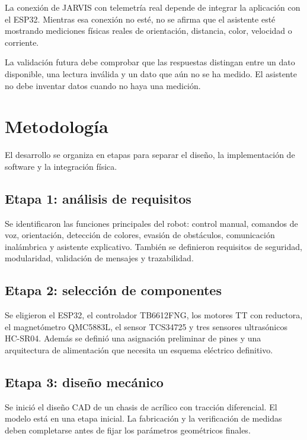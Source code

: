 \documentclass[journal]{IEEEtran}
\begin{document}
La conexión de JARVIS con telemetría real depende de integrar la aplicación con el ESP32. Mientras esa conexión no esté, no se afirma que el asistente esté mostrando mediciones físicas reales de orientación, distancia, color, velocidad o corriente.

La validación futura debe comprobar que las respuestas distingan entre un dato disponible, una lectura inválida y un dato que aún no se ha medido. El asistente no debe inventar datos cuando no haya una medición.


\section{Metodología}

El desarrollo se organiza en etapas para separar el diseño, la implementación de software y la integración física.

\subsection{Etapa 1: análisis de requisitos}

Se identificaron las funciones principales del robot: control manual, comandos de voz, orientación, detección de colores, evasión de obstáculos, comunicación inalámbrica y asistente explicativo. También se definieron requisitos de seguridad, modularidad, validación de mensajes y trazabilidad.

\subsection{Etapa 2: selección de componentes}

Se eligieron el ESP32, el controlador TB6612FNG, los motores TT con reductora, el magnetómetro QMC5883L, el sensor TCS34725 y tres sensores ultrasónicos HC-SR04. Además se definió una asignación preliminar de pines y una arquitectura de alimentación que necesita un esquema eléctrico definitivo.

\subsection{Etapa 3: diseño mecánico}

Se inició el diseño CAD de un chasis de acrílico con tracción diferencial. El modelo está en una etapa inicial. La fabricación y la verificación de medidas deben completarse antes de fijar los parámetros geométricos finales.
\end{document}
